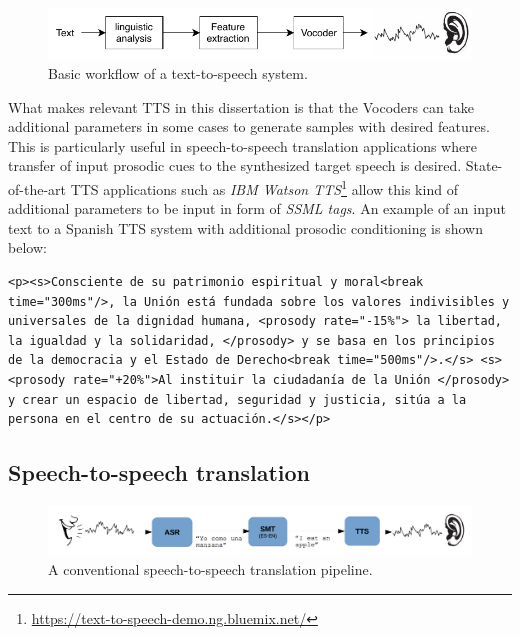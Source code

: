 \begin{figure}[t]
  \centering
  \includegraphics[width=0.9\linewidth]{img/tts_diagram.pdf}
  \caption{Basic workflow of a text-to-speech system.}
  \label{sota:figure:tts}
\end{figure}

What makes relevant TTS in this dissertation is that the Vocoders can take additional parameters in some cases to generate samples with desired features. This is particularly useful in speech-to-speech translation applications where transfer of input prosodic cues to the synthesized target speech is desired. State-of-the-art TTS applications such as \textit{IBM Watson TTS}\footnote{\url{https://text-to-speech-demo.ng.bluemix.net/}} allow this kind of additional parameters to be input in form of \textit{SSML tags}. An example of an input text to a Spanish TTS system with additional prosodic conditioning is shown below: 

\begin{lstlisting}
<p><s>Consciente de su patrimonio espiritual y moral<break time="300ms"/>, la Unión está fundada sobre los valores indivisibles y universales de la dignidad humana, <prosody rate="-15%"> la libertad, la igualdad y la solidaridad, </prosody> y se basa en los principios de la democracia y el Estado de Derecho<break time="500ms"/>.</s> <s><prosody rate="+20%">Al instituir la ciudadanía de la Unión </prosody> y crear un espacio de libertad, seguridad y justicia, sitúa a la persona en el centro de su actuación.</s></p>
\end{lstlisting}

\subsection{Speech-to-speech translation}
\label{sota:s2s}

\begin{figure}[t]
  \centering
  \includegraphics[width=\linewidth]{img/s2s_classic_pipeline.png}
  \caption{A conventional speech-to-speech translation pipeline.}
  \label{sota:s2s_classic}
\end{figure}

